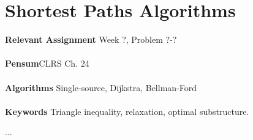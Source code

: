 
\chapter{Shortest Paths Algorithms}
\label{ch:shortestpathsalgorithms}

\textbf{Relevant Assignment} Week ?, Problem ?-?\\\\
\textbf{Pensum}CLRS Ch. 24\\\\
\textbf{Algorithms} Single-source, Dijkstra, Bellman-Ford\\\\
\textbf{Keywords} Triangle inequality, relaxation, optimal substructure.
\vspace{1in}

\noindent ...

